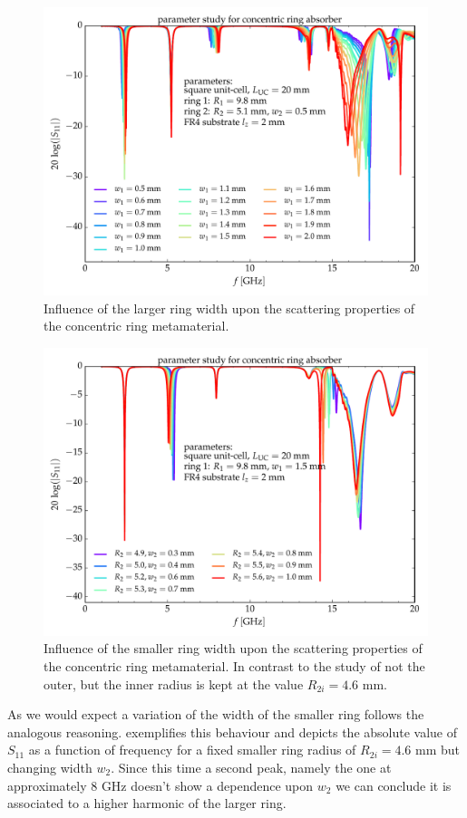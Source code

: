 \begin{figure}
\centering
\includegraphics[width=0.75\linewidth]{./media/dual-wifi_absorber_w1.pdf}
\caption{Influence of the larger ring width upon the scattering properties of the concentric ring metamaterial.}
\label{fig:w1_sweep}
\end{figure}

\begin{figure}
\centering
\includegraphics[width=0.75\linewidth]{./media/dual-wifi_absorber_w2.pdf}
\caption{Influence of the smaller ring width upon the scattering properties of the concentric ring metamaterial. In contrast to the study of  not the outer, but the inner radius is kept at the value $R_{2i}=4.6$ mm.}
\label{fig:w2_sweep}
\end{figure}

As we would expect a variation of the width of the smaller ring follows the analogous reasoning.  exemplifies this behaviour and depicts the absolute value of $S_{11}$ as a function of frequency for a fixed smaller ring radius of $R_{2i}=4.6$ mm but changing width $w_2$. Since this time a second peak, namely the one at approximately 8 GHz doesn't show a dependence upon $w_2$ we can conclude it is associated to a higher harmonic of the larger ring. 

